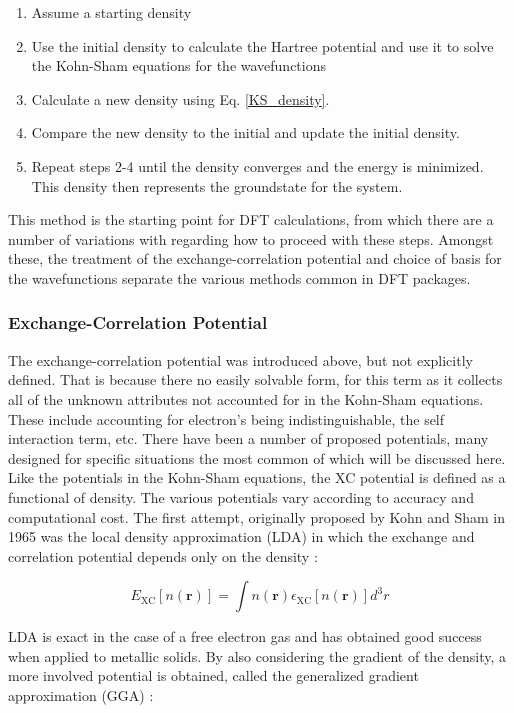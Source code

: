 \begin{enumerate}
	\item Assume a starting density
	\item Use the initial density to calculate the Hartree potential and use it to solve the Kohn-Sham equations for the wavefunctions
	\item Calculate a new density using Eq. \ref{KS_density}.
	\item Compare the new density to the initial and update the initial density. 
	\item Repeat steps 2-4 until the density converges and the energy is minimized. This density then represents the groundstate for the system.
\end{enumerate}

This method is the starting point for DFT calculations, from which there are a number of  variations with regarding how to proceed with these steps.  Amongst these, the treatment of the exchange-correlation potential and choice of basis for the wavefunctions separate the various methods common in DFT packages.  


\subsubsection{Exchange-Correlation Potential}
The exchange-correlation potential was introduced above, but not explicitly defined.  That is because there no easily solvable form, for this term as it collects all of the unknown attributes not accounted for in the Kohn-Sham equations.  These include accounting for electron's being indistinguishable, the self interaction term, etc.   There have been a number of proposed potentials, many designed for specific situations the most common of which will be discussed here.  Like the potentials in the Kohn-Sham equations, the XC potential is defined as a functional of density.  The various potentials vary according to accuracy and computational cost.  The first attempt, originally proposed by Kohn and Sham in 1965 was the local density approximation (LDA) in which the exchange and correlation potential depends only on the density \cite{tao_climbing_2003, ks_1965}: 

\begin{equation}
	E_{\mathrm{XC}}[n(\textbf{r})] = \int  n(\textbf{r}) \epsilon_{\mathrm{XC}}[n(\textbf{r})] d^3r
\end{equation}

LDA is exact in the case of a free electron gas and has obtained good success when applied to metallic solids.  By also considering the gradient of the density, a more involved potential is obtained, called the generalized gradient approximation (GGA) \cite{tao_climbing_2003,perdew_wang} : 


